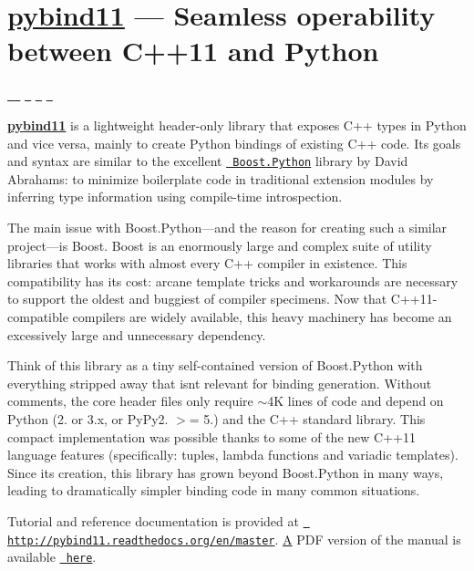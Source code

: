 

\section*{\mbox{\hyperlink{namespacepybind11}{pybind11}} — Seamless operability between C++11 and Python}

\href{http://pybind11.readthedocs.org/en/master/?badge=master}{\texttt{ }} \href{http://pybind11.readthedocs.org/en/stable/?badge=stable}{\texttt{ }} \href{https://gitter.im/pybind/Lobby}{\texttt{ }} \href{https://travis-ci.org/pybind/pybind11}{\texttt{ }} \href{https://ci.appveyor.com/project/wjakob/pybind11}{\texttt{ }}

{\bfseries{\mbox{\hyperlink{namespacepybind11}{pybind11}}}} is a lightweight header-\/only library that exposes C++ types in Python and vice versa, mainly to create Python bindings of existing C++ code. Its goals and syntax are similar to the excellent \href{http://www.boost.org/doc/libs/1_58_0/libs/python/doc/}{\texttt{ Boost.\+Python}} library by David Abrahams\+: to minimize boilerplate code in traditional extension modules by inferring type information using compile-\/time introspection.

The main issue with Boost.\+Python—and the reason for creating such a similar project—is Boost. Boost is an enormously large and complex suite of utility libraries that works with almost every C++ compiler in existence. This compatibility has its cost\+: arcane template tricks and workarounds are necessary to support the oldest and buggiest of compiler specimens. Now that C++11-\/compatible compilers are widely available, this heavy machinery has become an excessively large and unnecessary dependency.

Think of this library as a tiny self-\/contained version of Boost.\+Python with everything stripped away that isn\textquotesingle{}t relevant for binding generation. Without comments, the core header files only require $\sim$4K lines of code and depend on Python (2. or 3.\+x, or Py\+Py2. $>$= 5.) and the C++ standard library. This compact implementation was possible thanks to some of the new C++11 language features (specifically\+: tuples, lambda functions and variadic templates). Since its creation, this library has grown beyond Boost.\+Python in many ways, leading to dramatically simpler binding code in many common situations.

Tutorial and reference documentation is provided at \href{http://pybind11.readthedocs.org/en/master}{\texttt{ http\+://pybind11.\+readthedocs.\+org/en/master}}. \mbox{\hyperlink{struct_a}{A}} P\+DF version of the manual is available \href{https://media.readthedocs.org/pdf/pybind11/master/pybind11.pdf}{\texttt{ here}}.

